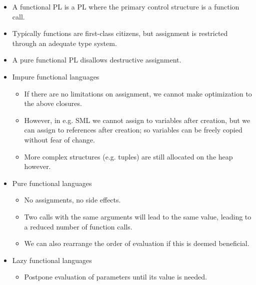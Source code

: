 \begin{itemize}

\item A functional PL is a PL where the primary control structure is a function
call.

\item Typically functions are first-class citizens, but assignment is
restricted through an adequate type system.

\item A pure functional PL disallows destructive assignment.

\item Impure functional languages

\begin{itemize}

\item If there are no limitations on assignment, we cannot make optimization to
the above closures. 

\item However, in e.g. SML we cannot assign to variables after creation, but we
can assign to references after creation; so variables can be freely copied
without fear of change.

\item More complex structures (e.g. tuples) are still allocated on the heap
however.

\end{itemize}

\item Pure functional languages

\begin{itemize}

\item No assignments, no side effects.

\item Two calls with the same arguments will lead to the same value, leading to
a reduced number of function calls. 

\item We can also rearrange the order of evaluation if this is deemed beneficial.

\end{itemize}

\item Lazy functional languages

\begin{itemize}

\item Postpone evaluation of parameters until its value is needed.


\end{itemize}
\end{itemize}
